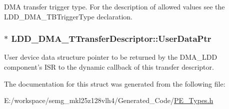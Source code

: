 D\-M\-A transfer trigger type. For the description of allowed values see the L\-D\-D\-\_\-\-D\-M\-A\-\_\-\-T\-B\-Trigger\-Type declaration. \hypertarget{struct_l_d_d___d_m_a___t_transfer_descriptor_a4136d6742944c7b04a94695c78b581b8}{
\subsubsection[{User\-Data\-Ptr}]{$\ast$ L\-D\-D\-\_\-\-D\-M\-A\-\_\-\-T\-Transfer\-Descriptor\-::\-User\-Data\-Ptr}}\label{struct_l_d_d___d_m_a___t_transfer_descriptor_a4136d6742944c7b04a94695c78b581b8}
User device data structure pointer to be returned by the D\-M\-A\-\_\-\-L\-D\-D component's I\-S\-R to the dynamic callback of this transfer descriptor. 

The documentation for this struct was generated from the following file\-:\begin{DoxyCompactItemize}
\item 
E\-:/workspace/semg\-\_\-mkl25z128vlh4/\-Generated\-\_\-\-Code/\hyperlink{_p_e___types_8h}{P\-E\-\_\-\-Types.\-h}\end{DoxyCompactItemize}
